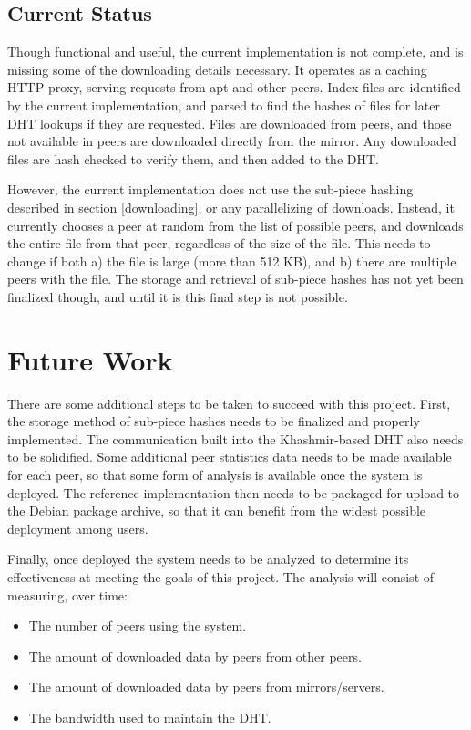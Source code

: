 \documentclass[conference]{IEEEtran}
\begin{document}
\subsection{Current Status}
\label{status}

Though functional and useful, the current implementation is not
complete, and is missing some of the downloading details necessary.
It operates as a caching HTTP proxy, serving
requests from apt and other peers. Index files are identified by the
current implementation, and parsed to find the hashes of files for later DHT
lookups if they are requested. Files are downloaded from
peers, and those not available in peers are downloaded directly
from the mirror. Any downloaded files are hash checked to verify
them, and then added to the DHT.

However, the current implementation does not use the sub-piece
hashing described in section \ref{downloading}, or any parallelizing
of downloads. Instead, it currently chooses a peer at random from
the list of possible peers, and downloads the entire file from that
peer, regardless of the size of the file. This needs to change if
both a) the file is large (more than 512 KB), and b) there are
multiple peers with the file. The storage and retrieval of sub-piece
hashes has not yet been finalized though, and until it is this final
step is not possible.


\section{Future Work}
\label{future}

There are some additional steps to be taken to succeed with this
project. First, the storage method of sub-piece hashes needs to be
finalized and properly implemented. The communication built into the
Khashmir-based DHT also needs to be solidified. Some additional peer
statistics data needs to be made available for each peer, so that
some form of analysis is available once the system is deployed. The
reference implementation then needs to be packaged for upload to the
Debian package archive, so that it can benefit from the widest
possible deployment among users.

Finally, once deployed the system needs to be analyzed to determine
its effectiveness at meeting the goals of this project. The analysis
will consist of measuring, over time:
\begin{itemize}
 \item The number of peers using the system.
 \item The amount of downloaded data by peers from other peers.
 \item The amount of downloaded data by peers from mirrors/servers.
 \item The bandwidth used to maintain the DHT.
\end{itemize}
\end{document}
